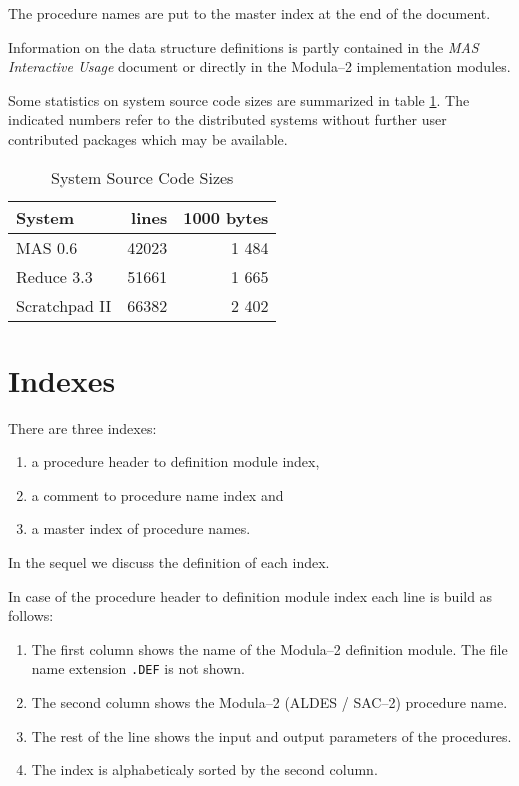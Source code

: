 The procedure names are put to the master index
at the end of the document.

Information on the data structure definitions is 
partly contained in the {\em MAS Interactive Usage} 
document or directly in the Modula--2 implementation modules.

Some statistics on system source code sizes are 
summarized in table \ref{tabSyS}.
The indicated numbers refer to the distributed systems 
without further user contributed packages which 
may be available.

\begin{table}
\begin{center}
\begin{tabular}{|l|r|r|}
\hline
System         &   lines  &  1000 bytes \\
\hline
MAS 0.6        &   42023  &    1 484    \\
Reduce 3.3     &   51661  &    1 665    \\
Scratchpad II  &   66382  &    2 402    \\
\hline
\end{tabular}
\end{center}
\label{tabSyS}
\caption{System Source Code Sizes}
\end{table}


\section{Indexes}

There are three indexes:
\begin{enumerate}
\item a procedure header to definition module index,
\item a comment to procedure name index and
\item a master index of procedure names.  
\end{enumerate}
In the sequel we discuss the definition of each index.

In case of the procedure header to definition module index 
each line is build as follows:
\begin{enumerate}
\item The first column shows the 
      name of the Modula--2 definition module. 
      The file name extension \verb/.DEF/ is not shown.
\item The second column shows the 
      Modula--2 (ALDES / SAC--2) procedure name. 
\item The rest of the line shows the 
      input and output parameters of the procedures.
\item The index is alphabeticaly sorted by the second column.
\end{enumerate}

